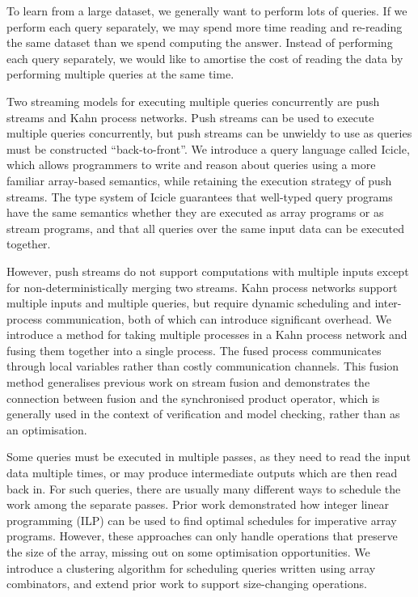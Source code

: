To learn from a large dataset, we generally want to perform lots of queries. If we perform each query separately, we may spend more time reading and re-reading the same dataset than we spend computing the answer. Instead of performing each query separately, we would like to amortise the cost of reading the data by performing multiple queries at the same time.

Two streaming models for executing multiple queries concurrently are push streams and Kahn process networks.
Push streams can be used to execute multiple queries concurrently, but push streams can be unwieldy to use as queries must be constructed ``back-to-front''. We introduce a query language called Icicle, which allows programmers to write and reason about queries using a more familiar array-based semantics, while retaining the execution strategy of push streams. The type system of Icicle guarantees that well-typed query programs have the same semantics whether they are executed as array programs or as stream programs, and that all queries over the same input data can be executed together.

However, push streams do not support computations with multiple inputs except for non-deterministically merging two streams. Kahn process networks support multiple inputs and multiple queries, but require dynamic scheduling and inter-process communication, both of which can introduce significant overhead. We introduce a method for taking multiple processes in a Kahn process network and fusing them together into a single process. The fused process communicates through local variables rather than costly communication channels. This fusion method generalises previous work on stream fusion and demonstrates the connection between fusion and the synchronised product operator, which is generally used in the context of verification and model checking, rather than as an optimisation.

Some queries must be executed in multiple passes, as they need to read the input data multiple times, or may produce intermediate outputs which are then read back in. For such queries, there are usually many different ways to schedule the work among the separate passes. Prior work demonstrated how integer linear programming (ILP) can be used to find optimal schedules for imperative array programs. However, these approaches can only handle operations that preserve the size of the array, missing out on some optimisation opportunities. We introduce a clustering algorithm for scheduling queries written using array combinators, and extend prior work to support size-changing operations.


